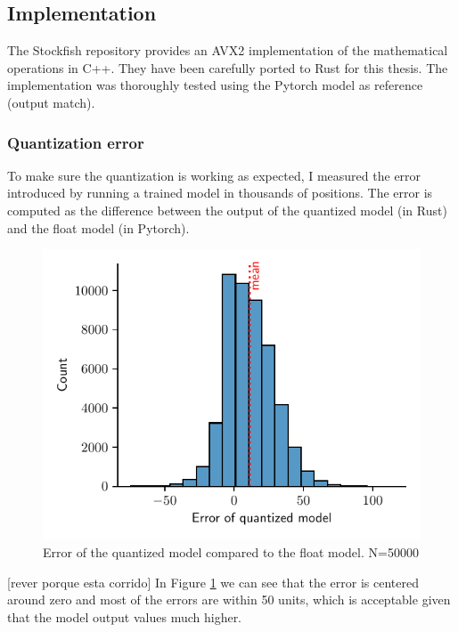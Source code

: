 \subsection{Implementation}

The Stockfish repository provides an AVX2 implementation of the mathematical operations in C++. They have been carefully ported to Rust for this thesis. The implementation was thoroughly tested using the Pytorch model as reference (output match).

\subsubsection{Quantization error}

To make sure the quantization is working as expected, I measured the error introduced by running a trained model in thousands of positions. The error is computed as the difference between the output of the quantized model (in Rust) and the float model (in Pytorch).

\begin{figure}[H]
\centering
\includegraphics[width=12cm]{./dynamic/output/quant_errors.pdf}
\caption{Error of the quantized model compared to the float model. N=50000}
\label{fig:quant_errors}
\end{figure}

[rever porque esta corrido]
In Figure \ref{fig:quant_errors} we can see that the error is centered around zero and most of the errors are within 50 units, which is acceptable given that the model output values much higher.

